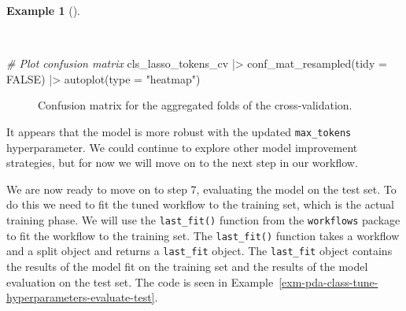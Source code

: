 \documentclass[
  letterpaper,
]{latex/krantz}
\newenvironment{Shaded}{\begin{snugshade}}{\end{snugshade}}
\newcommand{\AttributeTok}[1]{\textcolor[rgb]{0.00,0.00,0.00}{#1}}
\newcommand{\CommentTok}[1]{\textcolor[rgb]{0.00,0.00,0.00}{\textit{#1}}}
\newcommand{\ConstantTok}[1]{\textcolor[rgb]{0.00,0.00,0.00}{#1}}
\newcommand{\FunctionTok}[1]{\textcolor[rgb]{0.00,0.00,0.00}{#1}}
\newcommand{\NormalTok}[1]{\textcolor[rgb]{0.00,0.00,0.00}{#1}}
\newcommand{\SpecialCharTok}[1]{\textcolor[rgb]{0.00,0.00,0.00}{#1}}
\newcommand{\StringTok}[1]{\textcolor[rgb]{0.00,0.00,0.00}{#1}}
\theoremstyle{definition}
\newtheorem{example}{Example}[chapter]
\theoremstyle{remark}
\begin{document}
\begin{example}[]\protect\hypertarget{exm-pda-class-tune-hyperparameters-tokenfilter-evaluate-workflow-cv-confusion}{}\label{exm-pda-class-tune-hyperparameters-tokenfilter-evaluate-workflow-cv-confusion}

~

\begin{Shaded}
\begin{Highlighting}[]
\CommentTok{\# Plot confusion matrix}
\NormalTok{cls\_lasso\_tokens\_cv }\SpecialCharTok{|\textgreater{}}
  \FunctionTok{conf\_mat\_resampled}\NormalTok{(}\AttributeTok{tidy =} \ConstantTok{FALSE}\NormalTok{) }\SpecialCharTok{|\textgreater{}}
  \FunctionTok{autoplot}\NormalTok{(}\AttributeTok{type =} \StringTok{"heatmap"}\NormalTok{)}
\end{Highlighting}
\end{Shaded}

\begin{figure}[H]


\caption{\label{fig-pda-class-tune-hyperparameters-tokenfilter-evaluate-workflow-cv-confusion}Confusion
matrix for the aggregated folds of the cross-validation.}

\end{figure}%

\end{example}

It appears that the model is more robust with the updated
\texttt{max\_tokens} hyperparameter. We could continue to explore other
model improvement strategies, but for now we will move on to the next
step in our workflow.

We are now ready to move on to step 7, evaluating the model on the test
set. To do this we need to fit the tuned workflow to the training set,
which is the actual training phase. We will use the \texttt{last\_fit()}
function from the \texttt{workflows} package to fit the workflow to the
training set. The \texttt{last\_fit()} function takes a workflow and a
split object and returns a \texttt{last\_fit} object. The
\texttt{last\_fit} object contains the results of the model fit on the
training set and the results of the model evaluation on the test set.
The code is seen in
Example~\ref{exm-pda-class-tune-hyperparameters-evaluate-test}.
\end{document}

